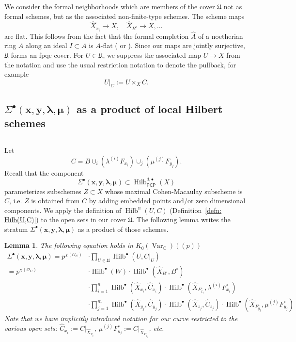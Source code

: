\documentclass[12pt]{amsart}
\newtheorem{lemma}[theorem]{Lemma}
\theoremstyle{definition}
\newcommand{\CC} {\mathbb{C}}          %
\renewcommand{\O}{\mathcal{O}}
\newcommand{\Hilb}{\operatorname{Hilb}}
\newcommand{\Var}{\operatorname{Var}}
\newcommand{\boldx}{\boldsymbol{x}}
\newcommand{\boldy}{\boldsymbol{y}}
\newcommand{\boldlambda}{\boldsymbol{\lambda }}
\newcommand{\boldmu}{\boldsymbol{\mu }}
\newcommand{\Sigmaxylambdamu}{\Sigma^{\bullet }(\boldx ,\boldy ,\boldlambda ,\boldmu )}
\renewcommand{\hat}{\widehat}
\newcommand{\Xhat}{\widehat{X}}
\newcommand{\PCP}{\mathsf{PCP}}
\newcommand{\SubSecSpace}{$\,$\vspace{0.2cm}\par } %
\begin{document}
We consider the formal neighborhoods which are members of the cover
$\mathfrak{U}$ not as formal schemes, but as the associated
non-finite-type schemes. The scheme maps
\[
\Xhat_{x_{i}}\to X, \quad \Xhat_{B^{\circ}}\to X, \dotsc 
\]
are flat. This follows from the fact that the formal completion
$\hat{A}$ of a noetherian ring $A$ along an ideal $I \subset A$ is
$A$-flat (\cite[Tag 0BNH, Lemma 10.96.2]{stacks-project} or
\cite[Prop.~10.14]{Atiyah-Macdonald}). Since our maps are jointly
surjective, $\mathfrak{U}$ forms an fpqc cover. For $U\in
\mathfrak{U}$, we suppress the associated map $U\to X$ from the
notation and use the usual restriction notation to denote the
pullback, for example
\[
U|_{C}:=U\times_{X}C. 
\]

\subsection{ $\Sigmaxylambdamu $ as a product of local Hilbert
schemes}\label{subsec: products of local Hilbert schemes}\SubSecSpace
Let
\[
C=B\cup_{i}\left(\lambda^{(i)}F_{x_{i}}
\right)\cup_{j}\left(\mu^{(j)}F_{y_{j}} \right).
\]
Recall that the component
\[
\Sigmaxylambdamu \subset \Hilb^{d,\bullet}_{\PCP}(X)
\]
parameterizes subschemes $Z\subset X$ whose maximal Cohen-Macaulay
subscheme is $C$, i.e. $Z$ is obtained from $C$ by adding embedded
points and/or zero dimensional components. We apply the definition of
$\Hilb^{n}(U,C)$ (Definition~\ref{defn: Hilb(U,C)}) to the open sets
in our cover $\mathfrak{U}$. The following lemma writes the stratum
$\Sigma^{\bullet}(\boldx ,\boldy ,\boldlambda ,\boldmu ) $ as a
product of those schemes.
\begin{lemma}\label{lem: Sigma = product of local Hilbert schemes}
The following equation holds in $K_{0}(\Var_{\CC})(\!(p)\!)$
\begin{align*}
\Sigmaxylambdamu = p^{\chi
(\O_{C})}&\cdot  \prod_{U\in \mathfrak{U}} \Hilb^{\bullet}(U,C|_{U})\\
=p^{\chi (\O_{C})}& \cdot  \Hilb^{\bullet}(W)\cdot
\Hilb^{\bullet}(\Xhat_{B^{\circ }},B^{\circ})\\
&\cdot \prod_{i=1}^{n}
\Hilb^{\bullet}(\Xhat_{x_{i}},\hat{C}_{x_{i}})\cdot
\Hilb^{\bullet}(\Xhat_{F^{\circ }_{x_{i}}},\lambda^{(i)}F^{\circ}_{x_{i}})\\
&\cdot \prod_{j=1}^{m}
\Hilb^{\bullet}(\Xhat_{y_{j}},\hat{C}_{y_{j}})\cdot
\Hilb^{\bullet}(\Xhat_{z_{j}},\hat{C}_{z_{j}})\cdot
\Hilb^{\bullet}(\Xhat_{F^{\circ }_{y_{j}}},\mu^{(j)}F^{\circ}_{y_{j}})
\end{align*}
Note that we have implicitly introduced notation for our curve
restricted to the various open sets: $\hat{C}_{x_{i}}:=C|_{\Xhat_{x_{i}}}$,
$ \mu^{(j)}F^{\circ}_{y_{j}}:=C|_{\Xhat_{F^{\circ }_{y_{j}}}}$, etc.
\end{lemma}
\end{document}

